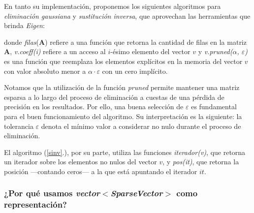\vspace{1em}
En tanto su implementación, proponemos los siguientes algoritmos para \textit{eliminación gaussiana} y \textit{sustitución inversa}, que aprovechan las herramientas que brinda \textit{Eigen}:

\vspace{1em}


\vspace{1em}
\noindent donde \textit{filas}(\textbf{A}) refiere a una función que retorna la cantidad de filas en la matriz \textbf{A}, \textit{v.coeff(i)} refiere a un acceso al $i$-ésimo elemento del vector $v$ y \textit{v.pruned($\alpha$, $\varepsilon$)} es una función que reemplaza los elementos explícitos en la memoria del vector $v$ con valor absoluto menor a $\alpha \cdot \varepsilon$ con un cero implícito.

\vspace{1em}
Notamos que la utilización de la función \textit{pruned} permite mantener una matriz esparsa a lo largo del proceso de eliminación a cuestas de una pérdida de precisión en los resultados. Por ello, una buena selección de $\varepsilon$ es fundamental para el buen funcionamiento del algoritmo. Su interpretación es la siguiente: la tolerancia $\varepsilon$ denota el mínimo valor a considerar no nulo durante el proceso de eliminación.

\vspace{1em}
\noindent %

\vspace{1em}


\vspace{1em}
El algoritmo (\ref{sinv}.), por su parte, utiliza las funciones \textit{iterador(v)}, que retorna un iterador sobre los elementos no nulos del vector $v$, y \textit{pos(it)}, que retorna la posición ---contando ceros--- a la que está apuntando el iterador $it$. 




\vspace{2em}
\subsubsection{¿Por qué usamos \textit{vector$<$SparseVector$>$} como representación?}\label{representacion}

